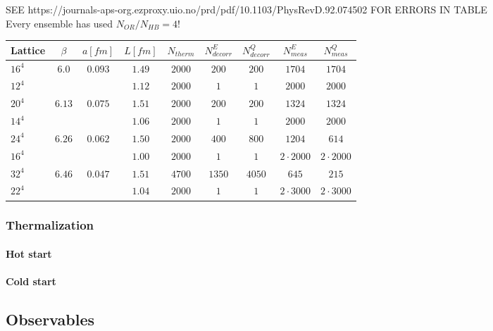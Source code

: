 \documentclass[a4paper,10pt]{article}
\begin{document}
SEE 
https://journals-aps-org.ezproxy.uio.no/prd/pdf/10.1103/PhysRevD.92.074502
FOR ERRORS IN TABLE\\Every ensemble has used $N_{OR}/N_{HB}=4$!\\
\begin{tabular}{lcccccccc}
\hline \hline Lattice & $\beta$ & $a[fm]$ & $L[fm]$ &$N_{therm}$ & $N_{decorr}^E$ & $N_{decorr}^Q$& $N_{meas}^E$& $N_{meas}^Q$\\
\hline		   $16^4$ &   $6.0$ & $0.093$ & $1.49$  		 		 &$2000$  	  & $200$		   & $200$		   & $1704$		 & $1704$ \\	  
	  		   $12^4$ & 		&     	  & $1.12$  		 		 &$2000$ 	  & $1$		   	   & $1$  		   & $2000$		 & $2000$\\ \hline 
	  		   $20^4$ &   $6.13$& $0.075$ & $1.51$  		 		 &$2000$ 	  & $200$		   & $200$		   & $1324$		 & $1324$ \\
	  		   $14^4$ & 		&  	 	  & $1.06$  		 		 &$2000$ 	  & $1$		       & $1$  		   & $2000$		 & $2000$\\ \hline
	  		   $24^4$ &   $6.26$& $0.062$ & $1.50$  		 		 &$2000$ 	  & $400$		   & $800$		   & $1204$		 & $614$ \\
	  		   $16^4$ & 		&  	 	  & $1.00$  		 		 &$2000$ 	  & $1$		       & $1$  		   & $2\cdot2000$		 & $2\cdot2000$\\ \hline
	  		   $32^4$ &   $6.46$& $0.047$ & $1.51$  		 		 &$4700$ 	  & $1350$		   & $4050$		   & $645$		 & $215$ \\
	  		   $22^4$ & 		&  	 	  & $1.04$  		 		 &$2000$ 	  & $1$		       & $1$  		   & $2\cdot3000$		 & $2\cdot3000$
\end{tabular}

\subsubsection{Thermalization}
\paragraph{Hot start}
\paragraph{Cold start}

\subsection{Observables}
\end{document}
